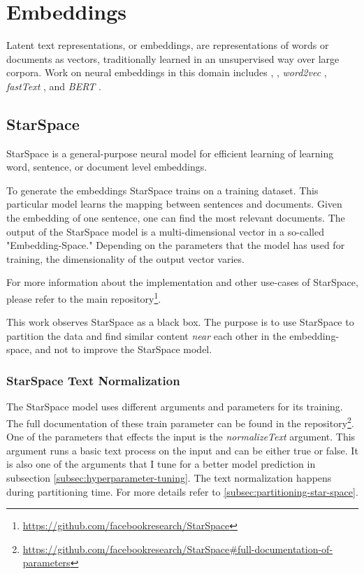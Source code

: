 \section{Embeddings}
\label{sec:embeddigns}
Latent text representations, or embeddings, are representations of words or documents as vectors, traditionally learned in an unsupervised way over large corpora. Work on neural embeddings in this domain includes \cite{bengioNeuralProbabilisticLanguage2003}, 
\cite{collobertNaturalLanguageProcessing2011}, \emph{word2vec} \cite{goldbergWord2vecExplainedDeriving2014}, \emph{fastText} \cite{joulinFastTextZipCompressing2016}, and \emph{BERT} \cite{devlinBERTPretrainingDeep2019}.

\subsection{StarSpace}
\label{subsec:StarSpace}
StarSpace \cite{wuStarSpaceEmbedAll2017a} is a general-purpose neural model for efficient learning of learning word, sentence, or document level embeddings.


To generate the embeddings StarSpace trains on a training dataset. This particular model learns the mapping between sentences and documents. Given the embedding of one sentence, one can find the most relevant documents. The output of the StarSpace model is a multi-dimensional vector in a so-called "Embedding-Space." Depending on the parameters that the model has used for training, the dimensionality of the output vector varies. 

For more information about the implementation and other use-cases of StarSpace, please refer to the main repository\footnote{\url{https://github.com/facebookresearch/StarSpace}}.


This work observes StarSpace as a black box. The purpose is to use StarSpace to partition the data and find similar content \emph{near} each other in the embedding-space, and not to improve the StarSpace model.

\subsubsection{StarSpace Text Normalization}
\label{subsubsec:star-space-text-normalization}
The StarSpace model uses different arguments and parameters for its training. The full documentation of these train parameter can be found in the repository\footnote{\url{https://github.com/facebookresearch/StarSpace\#full-documentation-of-parameters}}. One of the parameters that effects the input is the \emph{normalizeText} argument. This argument runs a basic text process on the input and can be either true or false. It is also one of the arguments that I tune for a better model prediction in subsection \ref{subsec:hyperparameter-tuning}. The text normalization happens during partitioning time. For more details refer to \ref{subsec:partitioning-star-space}.

